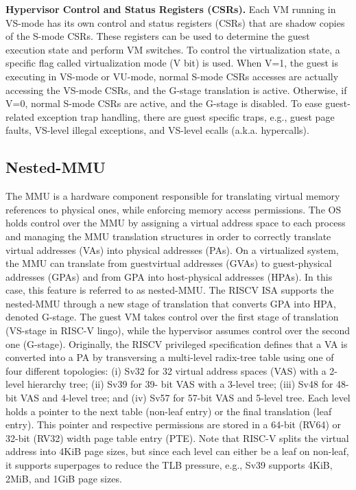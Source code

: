 \textbf{Hypervisor Control and Status Registers (CSRs).} Each VM
running in VS-mode has its own control and status registers
(CSRs) that are shadow copies of the S-mode CSRs. These
registers can be used to determine the guest execution state
and perform VM switches. To control the virtualization state,
a specific flag called virtualization mode (V bit) is used. When
V=1, the guest is executing in VS-mode or VU-mode, normal
S-mode CSRs accesses are actually accessing the VS-mode
CSRs, and the G-stage translation is active. Otherwise, if
V=0, normal S-mode CSRs are active, and the G-stage is
disabled. To ease guest-related exception trap handling, there
are guest specific traps, e.g., guest page faults, VS-level illegal
exceptions, and VS-level ecalls (a.k.a. hypercalls).

\subsection*{Nested-MMU}

The MMU is a hardware component responsible for translating virtual memory references to physical ones, while enforcing memory access permissions. The OS holds control over the
MMU by assigning a virtual address space to each process and
managing the MMU translation structures in order to correctly
translate virtual addresses (VAs) into physical addresses (PAs).
On a virtualized system, the MMU can translate from guestvirtual addresses (GVAs) to guest-physical addresses (GPAs)
and from GPA into host-physical addresses (HPAs). In this
case, this feature is referred to as nested-MMU. The RISCV ISA supports the nested-MMU through a new stage of
translation that converts GPA into HPA, denoted G-stage. The
guest VM takes control over the first stage of translation
(VS-stage in RISC-V lingo), while the hypervisor assumes
control over the second one (G-stage). Originally, the RISCV privileged specification defines that a VA is converted into
a PA by transversing a multi-level radix-tree table using one
of four different topologies: (i) Sv32 for 32 virtual address
spaces (VAS) with a 2-level hierarchy tree; (ii) Sv39 for 39-
bit VAS with a 3-level tree; (iii) Sv48 for 48-bit VAS and
4-level tree; and (iv) Sv57 for 57-bit VAS and 5-level tree.
Each level holds a pointer to the next table (non-leaf entry) or
the final translation (leaf entry). This pointer and respective
permissions are stored in a 64-bit (RV64) or 32-bit (RV32)
width page table entry (PTE). Note that RISC-V splits the
virtual address into 4KiB page sizes, but since each level can
either be a leaf on non-leaf, it supports superpages to reduce
the TLB pressure, e.g., Sv39 supports 4KiB, 2MiB, and 1GiB
page sizes.

